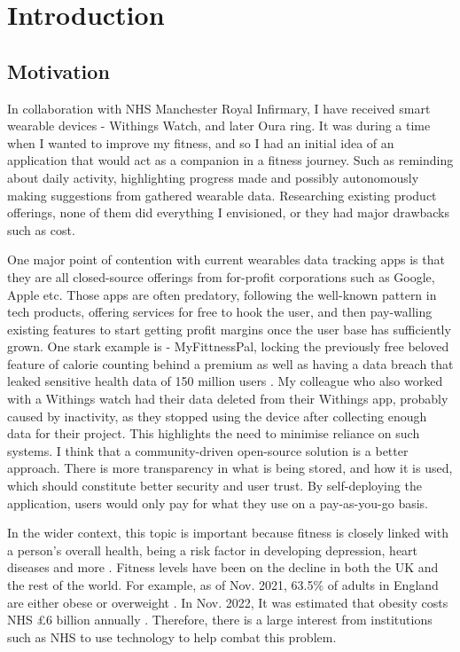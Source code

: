 \chapter{Introduction}
\label{cha:intro}

\section{Motivation}
\par
In collaboration with NHS Manchester Royal Infirmary, I have received smart wearable devices - Withings Watch,
and later Oura ring. It was during a time when I wanted to improve my fitness, and so I had an initial idea of an
application that would act as a companion in a fitness journey. Such as reminding about daily activity, highlighting progress made and
possibly autonomously making suggestions from gathered wearable data. Researching existing product offerings, none of them 
did everything I envisioned, or they had major drawbacks such as cost.
\par One major point of contention with current wearables data tracking apps is that they are all closed-source offerings
 from for-profit corporations such as Google, Apple etc.
 Those apps are often predatory, following the well-known pattern in tech products, offering
 services for free to hook the user, and then pay-walling existing features to start getting profit margins once the user base has sufficiently grown. 
 One stark example is - MyFittnessPal, locking the previously free beloved feature of 
 calorie counting behind a premium \cite{myfitnesspalPaywall} as well as having a data breach that leaked sensitive health data of 150 million users \cite{myFitnessPalDataBreach}.
 My colleague who also worked with a Withings watch had their data deleted from their Withings app, probably caused by inactivity, as they stopped using the device after collecting enough data for their project. 
 This highlights the need to minimise reliance on such systems. I think that a community-driven open-source solution is a better approach. 
 There is more transparency in what is being stored, and how it is used, which should constitute better security and 
 user trust. By self-deploying the application, users would only pay for what they use on a pay-as-you-go basis. 
\par
In the wider context, this topic is important because fitness is closely linked with a person's overall health, being a risk factor in developing depression, heart diseases and more \cite{nhsObesity}. 
Fitness levels have been on the decline in both the UK and the rest of the world.
For example, as of Nov. 2021, 63.5\% of adults in England are either obese or overweight \cite{ukObesity2023Survey}. 
In Nov. 2022, It was estimated that obesity costs NHS £6 billion annually \cite{nhsObesityCost}.
Therefore, there is a large interest from institutions such as NHS to use technology to help combat this problem.

